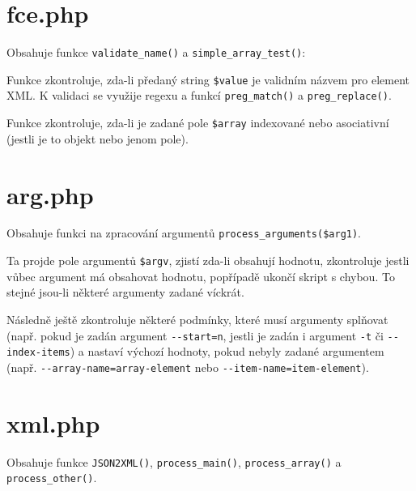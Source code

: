 \documentclass[a4paper, 10pt]{article}
\begin{document}
\section{fce.php}

Obsahuje funkce \verb|validate_name()| a \verb|simple_array_test()|:

\begin{description}
	\setlength\itemsep{0pt}
	
	\item[\texttt{validate\_name(\$value, \$int)}] Funkce zkontroluje, zda-li předaný string \verb|$value| je validním názvem pro element XML. K validaci se využije regexu a funkcí \verb|preg_match()| a \verb|preg_replace()|.
	
	\item[\texttt{simple\_array\_test(array \$array)}] Funkce zkontroluje, zda-li je zadané pole \verb|$array| indexované nebo asociativní (jestli je to objekt nebo jenom pole).
	
\end{description}

\section{arg.php}

Obsahuje funkci na zpracování argumentů \verb|process_arguments($arg1)|. 

Ta projde pole argumentů \verb|$argv|, zjistí zda-li obsahují hodnotu, zkontroluje jestli vůbec argument má obsahovat hodnotu, popřípadě ukončí skript s chybou. To stejné jsou-li některé argumenty zadané víckrát. 

Následně ještě zkontroluje některé podmínky, které musí argumenty splňovat (např. pokud je zadán argument \verb|--start=n|, jestli je zadán i argument \verb|-t| či \verb|--index-items|) a nastaví výchozí hodnoty, pokud nebyly zadané argumentem (např. \verb|--array-name=array-element| nebo \verb|--item-name=item-element|).

\section{xml.php}

Obsahuje funkce \verb|JSON2XML()|, \verb|process_main()|, \verb|process_array()| a \verb|process_other()|.
\end{document}
